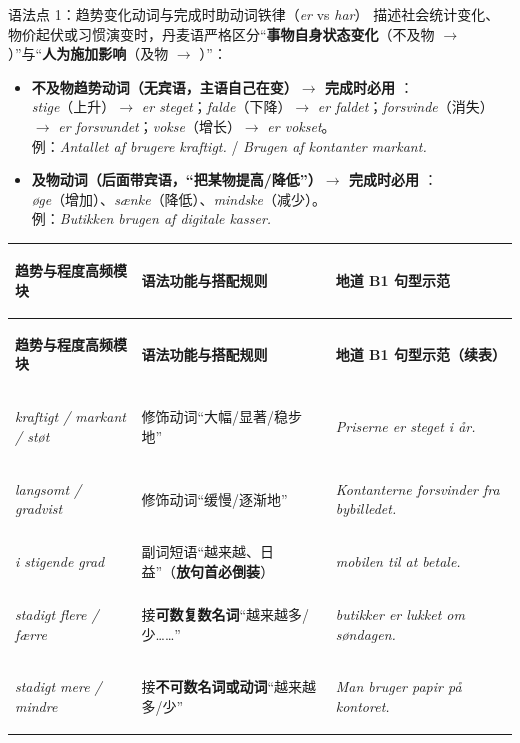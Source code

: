\begin{grammatikbox}{语法点 1：趋势变化动词与完成时助动词铁律（\textit{er} vs \textit{har}）}
描述社会统计变化、物价起伏或习惯演变时，丹麦语严格区分“\textbf{事物自身状态变化}（不及物 $\rightarrow$ ）”与“\textbf{人为施加影响}（及物 $\rightarrow$ ）”：
\begin{itemize}
  \item \textbf{不及物趋势动词（无宾语，主语自己在变）$\rightarrow$ 完成时必用 }：\\
    \textit{stige}（上升）$\rightarrow$ \textit{er steget}；\textit{falde}（下降）$\rightarrow$ \textit{er faldet}；\textit{forsvinde}（消失）$\rightarrow$ \textit{er forsvundet}；\textit{vokse}（增长）$\rightarrow$ \textit{er vokset}。\\
    例：\textit{Antallet af brugere  kraftigt.} / \textit{Brugen af kontanter  markant.}
  \item \textbf{及物动词（后面带宾语，“把某物提高/降低”）$\rightarrow$ 完成时必用 }：\\
    \textit{øge}（增加）、\textit{sænke}（降低）、\textit{mindske}（减少）。\\
    例：\textit{Butikken  brugen af digitale kasser.}
\end{itemize}
\end{grammatikbox}

\vspace{0.25em}
\renewcommand{\arraystretch}{1.24}
{\small
\begin{xltabular}{\linewidth}{@{} >{\bfseries\color{NCDNavy}\raggedright\arraybackslash}p{3.6cm} >{\raggedright\arraybackslash}p{4.1cm} >{\raggedright\arraybackslash}X @{}}
\toprule
\textbf{趋势与程度高频模块} & \textbf{语法功能与搭配规则} & \textbf{地道 B1 句型示范} \\
\midrule
\endfirsthead
\toprule
\textbf{趋势与程度高频模块} & \textbf{语法功能与搭配规则} & \textbf{地道 B1 句型示范（续表）} \\
\midrule
\endhead
\bottomrule
\endfoot
\textit{kraftigt / markant / støt} & 修饰动词“大幅/显著/稳步地” & \textit{Priserne er steget  i år.} \\
\textit{langsomt / gradvist} & 修饰动词“缓慢/逐渐地” & \textit{Kontanterne forsvinder  fra bybilledet.} \\
\textit{i stigende grad} & 副词短语“越来越、日益”（\textbf{放句首必倒装}） & \textit{  mobilen til at betale.} \\
\textit{stadigt flere / færre} & 接\textbf{可数复数名词}“越来越多/少……” & \textit{ butikker er lukket om søndagen.} \\
\textit{stadigt mere / mindre} & 接\textbf{不可数名词或动词}“越来越多/少” & \textit{Man bruger  papir på kontoret.} \\
\end{xltabular}
}

